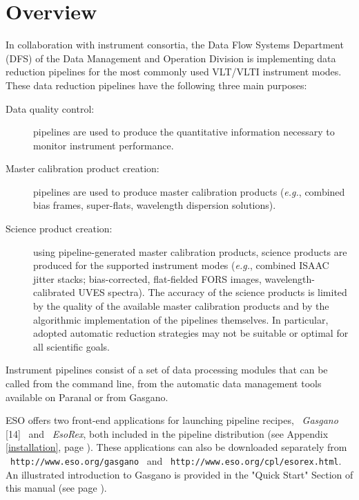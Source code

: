 \section{Overview}
\label{OVER}

In collaboration with instrument consortia, the Data Flow Systems
Department (DFS) of the Data Management and Operation Division is
implementing data reduction pipelines for the most commonly used VLT/VLTI
instrument modes. These data reduction pipelines have the following three
main purposes:

\begin{description}
\item [Data quality control:] pipelines are used to produce the
quantitative information necessary to monitor instrument performance.
\item [Master calibration product creation:] pipelines are used to
produce master calibration products ({\it e.g.}, combined bias frames,
super-flats, wavelength dispersion solutions).
\item [Science product creation:] using pipeline-generated master
calibration products, science products are produced for the supported
instrument modes ({\it e.g.}, combined ISAAC jitter stacks; bias-corrected,
flat-fielded FORS images, wavelength-calibrated UVES spectra). The
accuracy of the science products is limited by the quality of the
available master calibration products and by the algorithmic
implementation of the pipelines themselves. In particular, adopted
automatic reduction strategies may not be suitable or optimal for all
scientific goals.
\end{description}

Instrument pipelines consist of a set of data processing modules that can be
called from the command line, from the automatic data management tools 
available on Paranal or from Gasgano.



ESO offers two front-end applications for launching pipeline
recipes, \ {\it Gasgano} [14] \ and \ {\it EsoRex}, both included 
in the pipeline distribution (see Appendix \ref{installation}, 
page \pageref{installation}). These applications can also be downloaded 
separately from \ \texttt{http://www.eso.org/gasgano} 
\ and \ \texttt{http://www.eso.org/cpl/esorex.html}.
An illustrated introduction to Gasgano is provided in the "Quick Start" 
Section of this manual (see page \pageref{COOK}).


